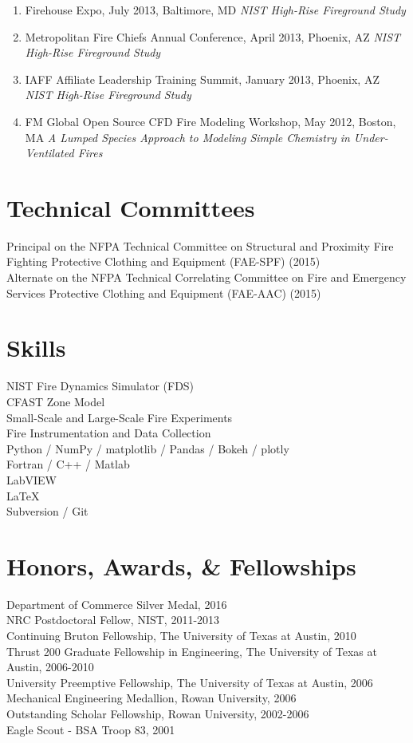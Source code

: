 \documentclass[10pt,letterpaper]{article}
\begin{document}
\begin{enumerate}
\item Firehouse Expo, July 2013, Baltimore, MD {\em NIST High-Rise Fireground Study}
\item Metropolitan Fire Chiefs Annual Conference, April 2013, Phoenix, AZ {\em NIST High-Rise Fireground Study}
\item IAFF Affiliate Leadership Training Summit, January 2013, Phoenix, AZ {\em NIST High-Rise Fireground Study}
\item FM Global Open Source CFD Fire Modeling Workshop, May 2012, Boston, MA {\em A Lumped Species Approach to Modeling Simple Chemistry in Under-Ventilated Fires}
\end{enumerate}

\clearpage

\section*{Technical Committees}

Principal on the NFPA Technical Committee on Structural and Proximity Fire Fighting Protective Clothing and Equipment (FAE-SPF) (2015) \\
\vskip1pt
Alternate on the NFPA Technical Correlating Committee on Fire and Emergency Services Protective Clothing and Equipment (FAE-AAC) (2015) \\

\section*{Skills}
NIST Fire Dynamics Simulator (FDS) \\
CFAST Zone Model \\
Small-Scale and Large-Scale Fire Experiments \\
Fire Instrumentation and Data Collection \\
Python / NumPy / matplotlib / Pandas / Bokeh / plotly \\
Fortran / C++ / Matlab \\
LabVIEW \\
\LaTeX \\
Subversion / Git \\

\section*{Honors, Awards, \& Fellowships}

Department of Commerce Silver Medal, 2016 \\
NRC Postdoctoral Fellow, NIST, 2011-2013 \\
Continuing Bruton Fellowship, The University of Texas at Austin, 2010 \\
Thrust 200 Graduate Fellowship in Engineering, The University of Texas at Austin, 2006-2010 \\
University Preemptive Fellowship, The University of Texas at Austin, 2006 \\
Mechanical Engineering Medallion, Rowan University, 2006 \\
Outstanding Scholar Fellowship, Rowan University, 2002-2006 \\
Eagle Scout - BSA Troop 83, 2001 \\
\end{document}
